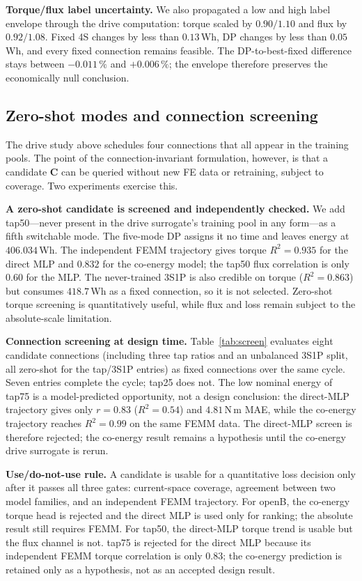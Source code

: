 \documentclass[review]{elsarticle}
\newcommand{\Cmat}{\boldsymbol{C}}
\begin{document}
\textbf{Torque/flux label uncertainty.} We also propagated a low and high
label envelope through the drive computation: torque scaled by
$0.90/1.10$ and flux by $0.92/1.08$. Fixed 4S changes by less than
$0.13$\,Wh, DP changes by less than $0.05$\,Wh, and every fixed connection
remains feasible. The DP-to-best-fixed difference stays between
$-0.011\,\%$ and $+0.006\,\%$; the envelope therefore preserves the
economically null conclusion.

\subsection{Zero-shot modes and connection screening}
\label{sec:results:zeroshot}

The drive study above schedules four connections that all appear in the
training pools. The point of the connection-invariant formulation,
however, is that a candidate $\Cmat$ can be queried without new FE data or
retraining, subject to coverage. Two experiments exercise this.

\textbf{A zero-shot candidate is screened and independently checked.} We add
tap50---never present in the drive surrogate's training pool in any
form---as a fifth switchable mode. The five-mode DP assigns it no time and
leaves energy at $406.034$\,Wh. The independent FEMM trajectory gives
torque $R^2=0.935$ for the direct MLP and $0.832$ for the co-energy model;
the tap50 flux correlation is only $0.60$ for the MLP. The never-trained
3S1P is also credible on torque ($R^2=0.863$) but consumes $418.7$\,Wh as a
fixed connection, so it is not selected. Zero-shot torque screening is
quantitatively useful, while flux and loss remain subject to the
absolute-scale limitation.

\textbf{Connection screening at design time.} Table~\ref{tab:screen}
evaluates eight candidate connections (including three tap ratios and an
unbalanced 3S1P split, all zero-shot for the tap/3S1P entries) as fixed
connections over the same cycle. Seven entries complete the cycle; tap25
does not. The low nominal energy of tap75 is a model-predicted opportunity,
not a design conclusion: the direct-MLP trajectory gives only $r=0.83$
($R^2=0.54$) and $4.81$\,N\,m MAE, while the co-energy trajectory reaches
$R^2=0.99$ on the same FEMM data. The direct-MLP screen is therefore
rejected; the co-energy result remains a hypothesis until the co-energy
drive surrogate is rerun.

\textbf{Use/do-not-use rule.} A candidate is usable for a quantitative
loss decision only after it passes all three gates: current-space coverage,
agreement between two model families, and an independent FEMM trajectory.
For openB, the co-energy torque head is rejected and the direct MLP is used
only for ranking; the absolute result still requires FEMM. For tap50, the
direct-MLP torque trend is usable but the flux channel is not. tap75 is
rejected for the direct MLP because its independent FEMM torque
correlation is only $0.83$; the co-energy prediction is retained only as
a hypothesis, not as an accepted design result.
\end{document}
